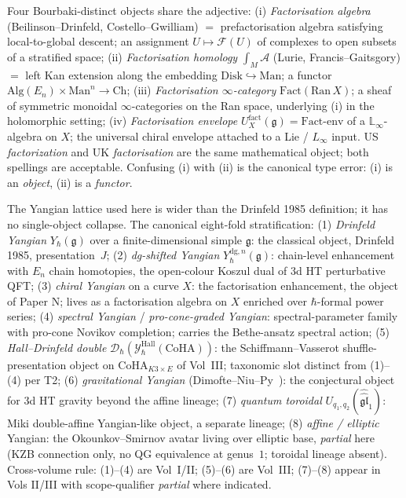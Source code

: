 \begin{description}[itemsep=4pt, leftmargin=2.0em, style=nextline]
\item[T9 (``factorisation''--four distinct structures).]
%
Four Bourbaki-distinct objects share the adjective:
(i) \emph{Factorisation algebra} (Beilinson--Drinfeld,
Costello--Gwilliam) $=$ prefactorisation algebra satisfying local-to-global
descent; an assignment $U \mapsto \mathcal F(U)$ of complexes to
open subsets of a stratified space;
(ii) \emph{Factorisation homology}
$\int_M \mathcal{A}$ (Lurie, Francis--Gaitsgory) $=$ left Kan
extension along the embedding $\mathrm{Disk} \hookrightarrow
\mathrm{Man}$; a functor $\mathrm{Alg}(E_n) \times
\mathrm{Man}^n \to \mathrm{Ch}$;
(iii) \emph{Factorisation $\infty$-category}
$\mathrm{Fact}(\mathrm{Ran}\,X)$; a sheaf of symmetric monoidal
$\infty$-categories on the Ran space, underlying (i) in the
holomorphic setting;
(iv) \emph{Factorisation envelope}
$U^{\mathrm{fact}}_X(\mathfrak g) = \mathrm{Fact}\text{-env}$ of a
$\mathbb{L}_\infty$-algebra on $X$; the universal chiral
envelope attached to a Lie / $L_\infty$ input.
US \emph{factorization} and UK \emph{factorisation} are the same
mathematical object; both spellings are acceptable. Confusing (i)
with (ii) is the canonical type error: (i) is an \emph{object}, (ii) is a
\emph{functor}.

\item[T10 (``Yangian''--eight distinct taxa).]
%
The Yangian lattice used here is wider than the Drinfeld
1985 definition; it has no single-object collapse. The
canonical eight-fold stratification:
(1) \emph{Drinfeld Yangian} $Y_\hbar(\mathfrak g)$ over a
finite-dimensional simple $\mathfrak g$: the classical object,
Drinfeld 1985, presentation~$J$;
(2) \emph{dg-shifted Yangian} $Y^{\mathrm{dg},n}_\hbar(\mathfrak g)$:
chain-level enhancement with $E_n$ chain homotopies, the open-colour
Koszul dual of 3d HT perturbative QFT;
(3) \emph{chiral Yangian} on a curve $X$: the factorisation
enhancement, the object of Paper N; lives as a factorisation algebra
on $X$ enriched over $\hbar$-formal power series;
(4) \emph{spectral Yangian} / \emph{pro-cone-graded Yangian}:
spectral-parameter family with pro-cone Novikov completion; carries
the Bethe-ansatz spectral action;
(5) \emph{Hall--Drinfeld double}
$\mathcal D_\hbar(\mathcal Y^{\mathrm{Hall}}_\hbar(\mathrm{CoHA}))$:
the Schiffmann--Vasserot shuffle-presentation object on
$\mathrm{CoHA}_{K3 \times E}$ of Vol~III; taxonomic slot distinct
from (1)--(4) per T2;
(6) \emph{gravitational Yangian} (Dimofte--Niu--Py~\cite{DNP25}):
the conjectural object for 3d HT gravity beyond the affine lineage;
(7) \emph{quantum toroidal}
$U_{q_1, q_2}(\widehat{\widehat{\mathfrak{gl}}}_1)$:
Miki double-affine Yangian-like object, a separate lineage;
(8) \emph{affine / elliptic} Yangian: the Okounkov--Smirnov avatar
living over elliptic base, \emph{partial} here (KZB
connection only, no QG equivalence at genus~$1$; toroidal lineage
absent).
Cross-volume rule: (1)--(4) are Vol~I/II; (5)--(6) are Vol~III;
(7)--(8) appear in Vols II/III with scope-qualifier
\emph{partial} where indicated.


\end{description}

